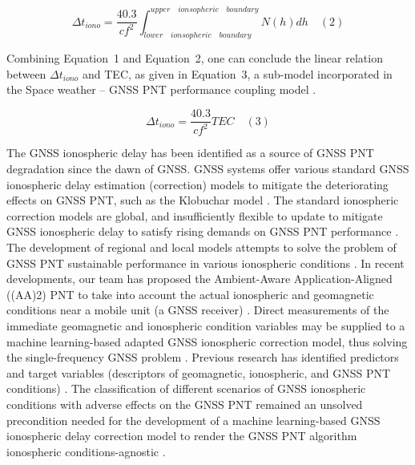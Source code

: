 \documentclass[sn-mathphys-num]{sn-jnl}%
\begin{document}
\begin{equation}
	\Delta t_{iono} = \frac{40.3}{c f^{2}} \int_{lower \quad ionsopheric \quad boundary}^{upper \quad ionsopheric \quad boundary}N(h)dh
	\quad\left(2\right)
\end{equation}

Combining Equation~1 and Equation~2, one can conclude the linear relation between $\Delta t_{iono}$ and TEC, as given in Equation~3, a sub-model incorporated in the Space weather – GNSS PNT performance coupling model \cite{filic2018modelling}.

\begin{equation}
	\Delta t_{iono} = \frac{40.3}{c f^{2}} TEC
	\quad\left(3\right)
\end{equation}

The GNSS ionospheric delay has been identified as a source of GNSS PNT degradation since the dawn of GNSS. GNSS systems offer various standard GNSS ionospheric delay estimation (correction) models to mitigate the deteriorating effects on GNSS PNT, such as the Klobuchar model \cite{spilker1996global, filic2018modelling}. The standard ionospheric correction models are global, and insufficiently flexible to update to mitigate GNSS ionospheric delay to satisfy rising demands on GNSS PNT performance \cite{filjar2024ambient, filic2018modelling}. The development of regional and local models attempts to solve the problem of GNSS PNT sustainable performance in various ionospheric conditions \cite{sikirica2021risk}. In recent developments, our team has proposed the Ambient-Aware Application-Aligned ((AA)2) PNT to take into account the actual ionospheric and geomagnetic conditions near a mobile unit (a GNSS receiver) \cite{filjar2022application, filic2018modelling, filjar2024ambient}. Direct measurements of the immediate geomagnetic and ionospheric condition variables may be supplied to a machine learning-based adapted GNSS ionospheric correction model, thus solving the single-frequency GNSS problem \cite{filjar2022application}. Previous research has identified predictors and target variables (descriptors of geomagnetic, ionospheric, and GNSS PNT conditions) \cite{filic2018modelling, natras2022ensemble, natras2023regional}. The classification of different scenarios of GNSS ionospheric conditions with adverse effects on the GNSS PNT remained an unsolved precondition needed for the development of a machine learning-based GNSS ionospheric delay correction model to render the GNSS PNT algorithm ionospheric conditions-agnostic \cite{filjar2022application, filjar2024ambient}.
\end{document}
